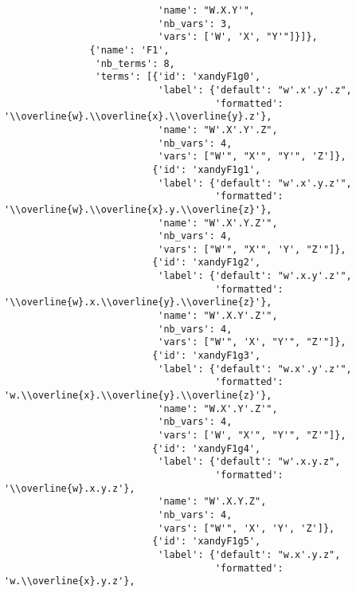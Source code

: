 \begin{verbatim}
                           'name': "W.X.Y'",
                           'nb_vars': 3,
                           'vars': ['W', 'X', "Y'"]}]},
               {'name': 'F1',
                'nb_terms': 8,
                'terms': [{'id': 'xandyF1g0',
                           'label': {'default': "w'.x'.y'.z",
                                     'formatted': '\\overline{w}.\\overline{x}.\\overline{y}.z'},
                           'name': "W'.X'.Y'.Z",
                           'nb_vars': 4,
                           'vars': ["W'", "X'", "Y'", 'Z']},
                          {'id': 'xandyF1g1',
                           'label': {'default': "w'.x'.y.z'",
                                     'formatted': '\\overline{w}.\\overline{x}.y.\\overline{z}'},
                           'name': "W'.X'.Y.Z'",
                           'nb_vars': 4,
                           'vars': ["W'", "X'", 'Y', "Z'"]},
                          {'id': 'xandyF1g2',
                           'label': {'default': "w'.x.y'.z'",
                                     'formatted': '\\overline{w}.x.\\overline{y}.\\overline{z}'},
                           'name': "W'.X.Y'.Z'",
                           'nb_vars': 4,
                           'vars': ["W'", 'X', "Y'", "Z'"]},
                          {'id': 'xandyF1g3',
                           'label': {'default': "w.x'.y'.z'",
                                     'formatted': 'w.\\overline{x}.\\overline{y}.\\overline{z}'},
                           'name': "W.X'.Y'.Z'",
                           'nb_vars': 4,
                           'vars': ['W', "X'", "Y'", "Z'"]},
                          {'id': 'xandyF1g4',
                           'label': {'default': "w'.x.y.z",
                                     'formatted': '\\overline{w}.x.y.z'},
                           'name': "W'.X.Y.Z",
                           'nb_vars': 4,
                           'vars': ["W'", 'X', 'Y', 'Z']},
                          {'id': 'xandyF1g5',
                           'label': {'default': "w.x'.y.z",
                                     'formatted': 'w.\\overline{x}.y.z'},

\end{verbatim}
